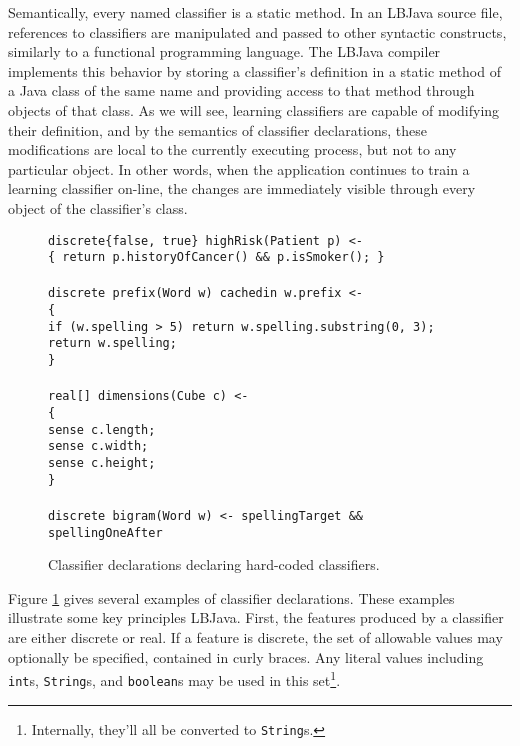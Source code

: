 Semantically, every named classifier is a static method.  In an LBJava source
file, references to classifiers are manipulated and passed to other syntactic
constructs, similarly to a functional programming language.  The LBJava compiler
implements this behavior by storing a classifier's definition in a static
method of a Java class of the same name and providing access to that method
through objects of that class.  As we will see, learning classifiers are
capable of modifying their definition, and by the semantics of classifier
declarations, these modifications are local to the currently executing
process, but not to any particular object.  In other words, when the
application continues to train a learning classifier on-line, the changes are
immediately visible through every object of the classifier's class. \\

\begin{figure}
\begin{center}
\begin{algorithm}
    {\tt discrete\{false, true\} highRisk(Patient p) <-}
\\  {\tt \{ return p.historyOfCancer() \&\& p.isSmoker(); \}}
\\
\\  {\tt discrete prefix(Word w) cachedin w.prefix <-}
\\  {\tt \{} \+
\\  {\tt  if (w.spelling > 5) {\tt return} w.spelling.substring(0, 3);}
\\  {\tt  return w.spelling;} \-
\\  {\tt \}}
\\
\\  {\tt real[] dimensions(Cube c) <-}
\\  {\tt \{} \+
\\  {\tt  sense c.length;}
\\  {\tt  sense c.width;}
\\  {\tt  sense c.height;} \-
\\  {\tt \}}
\\
\\  {\tt discrete bigram(Word w) <- spellingTarget \&\& spellingOneAfter}
\end{algorithm}
\end{center}
\caption{Classifier declarations declaring hard-coded classifiers.}
\label{figure:classifierDeclarations}
\end{figure}

Figure \ref{figure:classifierDeclarations} gives several examples of
classifier declarations.  These examples illustrate some key principles LBJava.
First, the features produced by a classifier are either discrete or real.  If
a feature is discrete, the set of allowable values may optionally be
specified, contained in curly braces.  Any literal values including {\tt
int}s, {\tt String}s, and {\tt boolean}s may be used in this
set\footnote{Internally, they'll all be converted to {\tt String}s.}. \\

